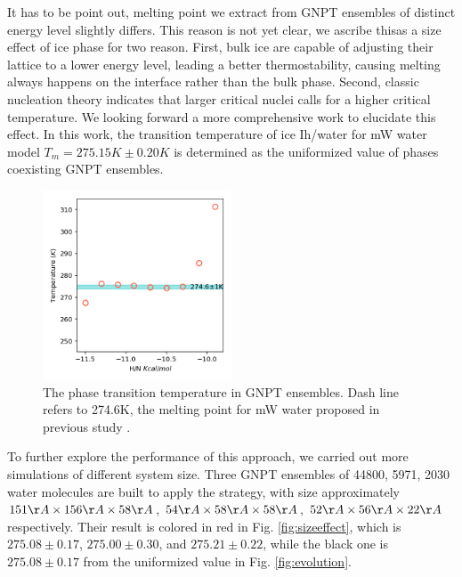 \documentclass[aps,prl,twocolumn,superscriptaddress]{revtex4-1}
\begin{document}
It has to be point out, melting point we extract from GNPT ensembles of distinct energy level slightly differs. This reason is not yet clear, we ascribe thisas a size effect of ice phase for two reason. First, bulk ice are capable of adjusting their lattice to a lower energy level, leading a better thermostability, causing melting always happens on the interface rather than the bulk phase. Second, classic nucleation theory indicates that larger critical nuclei calls for a higher critical temperature.  We looking forward a more comprehensive work to elucidate this effect. In this work, the transition temperature of ice Ih/water for mW water model $T_m=275.15K\pm 0.20K$ is determined as the uniformized value of phases coexisting GNPT ensembles. \begin{figure}[ht]
\centering{}\includegraphics[width=0.5\textwidth]{PTtemp-mw.png} 
\caption{The phase transition temperature in GNPT ensembles. Dash line refers to 274.6K, the melting point for mW water proposed in previous study \cite{Molinero2009} . 
\label{fig:PTtemp-mw}} 
\end{figure}
To further explore the performance of this approach, we carried out more simulations of different system size. Three GNPT ensembles of 44800, 5971, 2030 water molecules are built  to apply the strategy, with size approximately $151\AA \times  156 \AA \times  58 \AA$, $54 \AA \times  58 \AA \times  58 \AA$, $52\AA \times  56 \AA \times  22\AA$ respectively.  Their result is colored in red in Fig. \ref{fig:sizeeffect},  which is $275.08\pm 0.17$, $275.00\pm 0.30$, and $275.21\pm 0.22$, while the black one is $275.08\pm 0.17$  from the uniformized value in Fig. \ref{fig:evolution}.
\end{document}
